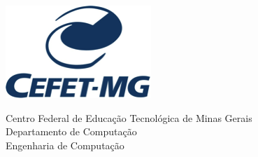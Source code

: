 %
%
%
%
%
%
%
%


\begin{folhadeaprovacao} 

\begin{flushleft} 
\begin{minipage}{0.25\textwidth}
\includegraphics[scale=0.7]{figuras/logo.png} 
\end{minipage}
\hfill
\begin{minipage}{0.7\textwidth}
\begin{flushleft}
\begin{center}
Centro Federal de Educação Tecnológica de Minas Gerais \\
Departamento de Computação \\
Engenharia de Computação
\end{center}
\end{flushleft}
\end{minipage}
\end{flushleft}

\vfill

 \vfill
\end{folhadeaprovacao}
